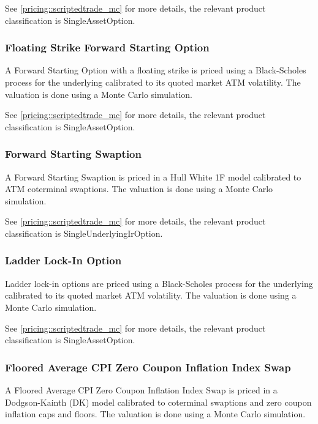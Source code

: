See \ref{pricing::scriptedtrade_mc} for more details, the relevant product classification is SingleAssetOption.

\subsubsection{Floating Strike Forward Starting Option}
\label{pricing::floating_strike_forward_starting_option}

A Forward Starting Option with a floating strike is priced using a Black-Scholes process for the underlying
calibrated to its quoted market ATM volatility. The valuation is done using a Monte Carlo simulation.

See \ref{pricing::scriptedtrade_mc} for more details, the relevant product classification is SingleAssetOption.

\subsubsection{Forward Starting Swaption}
\label{pricing::forward_starting_swaption}

A Forward Starting Swaption is priced in a Hull White 1F model calibrated to ATM coterminal
swaptions. The valuation is done using a Monte Carlo simulation.

See \ref{pricing::scriptedtrade_mc} for more details, the relevant product classification is SingleUnderlyingIrOption.

\subsubsection{Ladder Lock-In Option}
\label{pricing::ladder_lockin_option}

Ladder lock-in options are priced using a Black-Scholes process for the underlying calibrated to its quoted market
ATM volatility. The valuation is done using a Monte Carlo simulation.

See \ref{pricing::scriptedtrade_mc} for more details, the relevant product classification is SingleAssetOption.

\subsubsection{Floored Average CPI Zero Coupon Inflation Index Swap}
\label{pricing::floored_average_cpi_zciis}

A Floored Average CPI Zero Coupon Inflation Index Swap is priced in a Dodgson-Kainth (DK) model calibrated to coterminal 
swaptions and zero coupon inflation caps and floors. The valuation is done using a Monte Carlo simulation.

